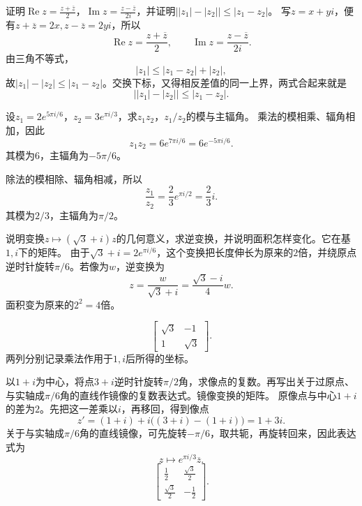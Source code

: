 证明\(\operatorname{Re} z = \frac{z + \overline{z}}{2}\)，\(\operatorname{Im} z = \frac{z - \overline{z}}{2 i}\)，并证明\(\left| \left| z_{1} \right| - \left| z_{2} \right| \right| \le \left| z_{1} - z_{2} \right|\)。
\solutionanswer
写\(z=x+yi\)，便有\(z+\overline z=2x,z-\overline z=2yi\)，所以
\[
\operatorname{Re}z=\frac{z+\overline z}2,\qquad
\operatorname{Im}z=\frac{z-\overline z}{2i}.
\]
由三角不等式，
\[
|z_1|\le|z_1-z_2|+|z_2|,
\]
故\(|z_1|-|z_2|\le|z_1-z_2|\)。交换下标，又得相反差值的同一上界，两式合起来就是
\[
\bigl||z_1|-|z_2|\bigr|\le|z_1-z_2|.
\]


设\(z_{1} = 2 e^{5 \pi i / 6}\)，\(z_{2} = 3 e^{\pi i / 3}\)，求\(z_{1} z_{2}\)，\(z_{1} / z_{2}\)的模与主辐角。
\solutionanswer
乘法的模相乘、辐角相加，因此
\[
z_1z_2=6e^{7\pi i/6}=6e^{-5\pi i/6}.
\]
其模为\(6\)，主辐角为\(-5\pi/6\)。

除法的模相除、辐角相减，所以
\[
\frac{z_1}{z_2}=\frac23e^{\pi i/2}=\frac23i.
\]
其模为\(2/3\)，主辐角为\(\pi/2\)。


说明变换\(z \mapsto \left( \sqrt{3} + i \right) z\)的几何意义，求逆变换，并说明面积怎样变化。它在基\(1 , i\)下的矩阵。
\solutionanswer
由于\(\sqrt3+i=2e^{\pi i/6}\)，这个变换把长度伸长为原来的\(2\)倍，并绕原点逆时针旋转\(\pi/6\)。若像为\(w\)，逆变换为
\[
z=\frac{w}{\sqrt3+i}=\frac{\sqrt3-i}{4}w.
\]
面积变为原来的\(2^2=4\)倍。

\[
\begin{bmatrix}\sqrt3&-1\\1&\sqrt3\end{bmatrix}.
\]
两列分别记录乘法作用于\(1,i\)后所得的坐标。


以\(1 + i\)为中心，将点\(3 + i\)逆时针旋转\(\pi / 2\)角，求像点的复数。再写出关于过原点、与实轴成\(\pi / 6\)角的直线作镜像的复数表达式。镜像变换的矩阵。
\solutionanswer
原像点与中心\(1+i\)的差为\(2\)。先把这一差乘以\(i\)，再移回，得到像点
\[
z'=(1+i)+i\bigl((3+i)-(1+i)\bigr)=1+3i.
\]
关于与实轴成\(\pi/6\)角的直线镜像，可先旋转\(-\pi/6\)，取共轭，再旋转回来，因此表达式为
\[
z\longmapsto e^{\pi i/3}\overline z.
\]
\[
\begin{bmatrix}\frac12&\frac{\sqrt3}2\\
\frac{\sqrt3}2&-\frac12\end{bmatrix}.
\]


